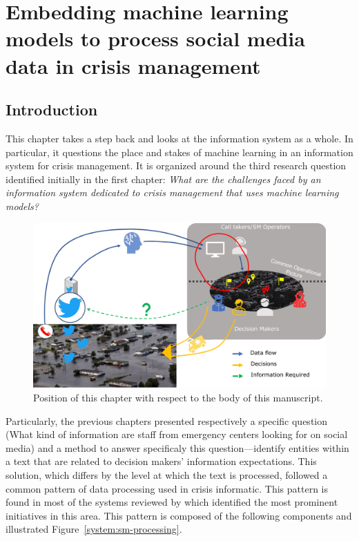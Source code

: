 \chapter{Embedding machine learning models to process social media data in crisis management}

\section*{Introduction}
This chapter takes a step back and looks at the information system as a whole.
In particular, it questions the place and stakes of machine learning in an information system for crisis management.
It is organized around the third research question identified initially in the first chapter:
\textit{What are the challenges faced by an information system dedicated to crisis management that uses machine learning models?}

\begin{figure}[htb]
    \centering
    \includegraphics[width=\textwidth]{figures/chap-5/position-chapter.pdf}
    \caption{Position of this chapter with respect to the body of this manuscript.}
    \label{system:big-picture-manuscrit}
\end{figure}

Particularly, the previous chapters presented respectively a specific question (What kind of information are staff from emergency centers looking for on social media)
and a method to answer specificaly this question—identify entities within a text that are related to decision makers' information expectations.
This solution, which differs by the level at which the text is processed, followed a common pattern of data processing used in crisis informatic.
This pattern is found in most of the systems reviewed by \textcite{ofliUsingArtificialIntelligence2020}
which identified the most prominent initiatives in this area.
This pattern is composed of the following components and illustrated Figure~\ref{system:sm-processing}.

